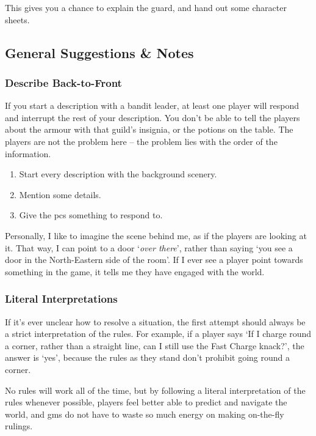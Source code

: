 \begin{multicols}{2}
This gives you a chance to explain the \gls{guard}, and hand out some character sheets.

\subsection{General Suggestions \& Notes}

\subsubsection{Describe Back-to-Front}

If you start a description with a bandit leader, at least one player will respond and interrupt the rest of your description.
You don't be able to tell the players about the armour with that guild's insignia, or the potions on the table.
The players are not the problem here -- the problem lies with the order of the information.

\begin{enumerate}
  \item
  Start every description with the background scenery.
  \item
  Mention some details.
  \item
  Give the \glspl{pc} something to respond to.
\end{enumerate}

\noindent
Personally, I like to imagine the scene behind me, as if the players are looking at it.
That way, I can point to a door `\emph{over there}', rather than saying `you see a door in the North-Eastern side of the room'.
If I ever see a player point towards something in the game, it tells me they have engaged with the world.

\subsubsection{Literal Interpretations}

If it's ever unclear how to resolve a situation, the first attempt should always be a strict interpretation of the rules.
For example, if a player says `If I charge round a corner, rather than a straight line, can I still use the Fast Charge knack?', the answer is `yes', because the rules as they stand don't prohibit going round a corner.

No rules will work all of the time, but by following a literal interpretation of the rules whenever possible, players feel better able to predict and navigate the world, and \glspl{gm} do not have to waste so much energy on making on-the-fly rulings.


\end{multicols}
